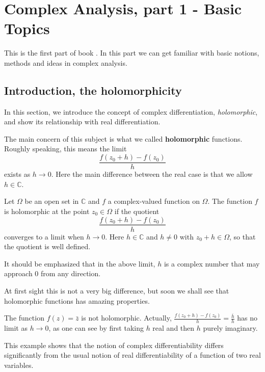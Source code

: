 \documentclass{chapter}
\author{Xu Jinwen}
\date{}
\begin{document}
        \chapter{Complex Analysis, part 1 -  Basic Topics}
        
        \begin{summary}
            This is the first part of book \cite{Stein2003}. In this part we can get familiar with basic notions, methods and ideas in complex analysis.
        \end{summary}

        \section{Introduction, the holomorphicity}\label{section: introduction, holomorphic}
            In this section, we introduce the concept of complex differentiation, \emph{holomorphic}, and show its relationship with real differentiation.

            \bigskip
            The main concern of this subject is what we called \textbf{holomorphic} functions. Roughly speaking, this means the limit \[\frac{f\left(z_{0}+h\right)-f\left(z_{0}\right)}{h}\] exists as $h\to 0$. Here the main difference between the real case is that we allow $h\in\mathbb{C}$. 
            
            \begin{definition}
                Let $\Omega$ be an open set in $\mathbb{C}$ and $f$ a complex-valued function on $\Omega$. The function $f$ is holomorphic at the point $z_0 \in \Omega$ if the quotient \[\frac{f\left(z_{0}+h\right)-f\left(z_{0}\right)}{h}\] converges to a limit when $h\to 0$. Here $h\in\mathbb{C}$ and $h\neq 0$ with $z_0 + h \in \Omega$, so that the quotient is well defined.
            \end{definition}
            \begin{remark}
                It should be emphasized that in the above limit, $h$ is a complex number that may approach $0$ from any direction.
            \end{remark}
            
            At first sight this is not a very big difference, but soon we shall see that holomorphic functions has amazing properties.

            \begin{example}
                The function $f(z) = \bar z$ is not holomorphic. Actually, $\frac{f\left(z_{0}+h\right)-f\left(z_{0}\right)}{h}=\frac{\overline{h}}{h}$ has no limit as $h\to 0$, as one can see by first taking $h$ real and then $h$ purely imaginary.

                This example shows that the notion of complex differentiability differs significantly from the usual notion of real differentiability of a function of two real variables.
            \end{example}
\end{document}
